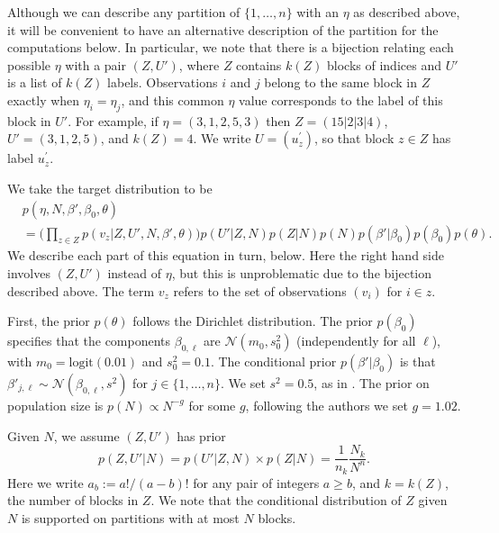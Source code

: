 \documentclass{article}
\begin{document}
Although we can describe any partition of $\{1, \dots, n\}$ with an $\eta$ as described above, it will be convenient to have an alternative description of the partition for the computations below. In particular, we note that there is a bijection relating each possible $\eta$ with a pair $(Z,U')$, where $Z$ contains $k(Z)$ blocks of indices and $U'$ is a list of $k(Z)$ labels.
Observations $i$ and $j$ belong to the same block in $Z$ exactly when $\eta_i = \eta_j$, and this common $\eta$ value corresponds to the label of this block in $U'$.
For example, if $\eta = (3,1,2,5,3)$ then $Z = (15|2|3|4)$, $U'=(3,1,2,5)$, and $k(Z) = 4$. We write $U = (u_z^\prime)$, so that block $z \in Z$ has label $u_z^\prime$.

We take the target distribution to be
\begin{align}
    & p(\eta, N, \beta', \beta_0, \theta)\nonumber \\
    & = \Big( \prod_{z\in Z} p(v_z|Z,U',N,\beta',\theta) \Big) p(U'|Z,N)p(Z|N)p(N)p(\beta'|\beta_0) p(\beta_0) p(\theta). \label{eq:posteriorfactorization}
\end{align}
We describe each part of this equation in turn, below.
Here the right hand side involves $(Z,U')$ instead of $\eta$, but this is unproblematic due to the bijection described above. 
The term $v_z$ refers to the set of observations $(v_i)$ for $i\in z$. 

First, the prior $p(\theta)$ follows the Dirichlet distribution.
The prior $p(\beta_0)$ specifies that the components $\beta_{0,\ell}$ are $\mathcal{N}(m_0, s_0^2)$ (independently for all $\ell$), with $m_0=\text{logit}(0.01)$ and $s_0^2 = 0.1$. The conditional prior $p(\beta' | \beta_0)$ is that 
$\beta'_{j,\ell} \sim \mathcal{N}(\beta_{0,\ell},s^2)$
for $j\in\{1,\ldots,n\}$. We set $s^2 = 0.5$, as in \citet{tancredi2018unified}.
The prior on population size is $p(N)\propto N^{-g}$ for some $g$, following the authors we set $g=1.02$.

Given $N$, we assume $(Z,U')$ has prior
\begin{equation}
\label{eq:priorZU}
    p(Z,U'|N) = p(U'|Z,N)\times p(Z|N) = \frac{1}{n_k} \frac{N_k}{N^n}.
\end{equation}
Here we write $a_b := a!/(a-b)!$ for any pair of integers $a\geq b$, and $k = k(Z)$, the number of blocks in $Z$. We note that the conditional distribution of $Z$ given $N$ is supported on partitions with at most $N$ blocks.
\end{document}
